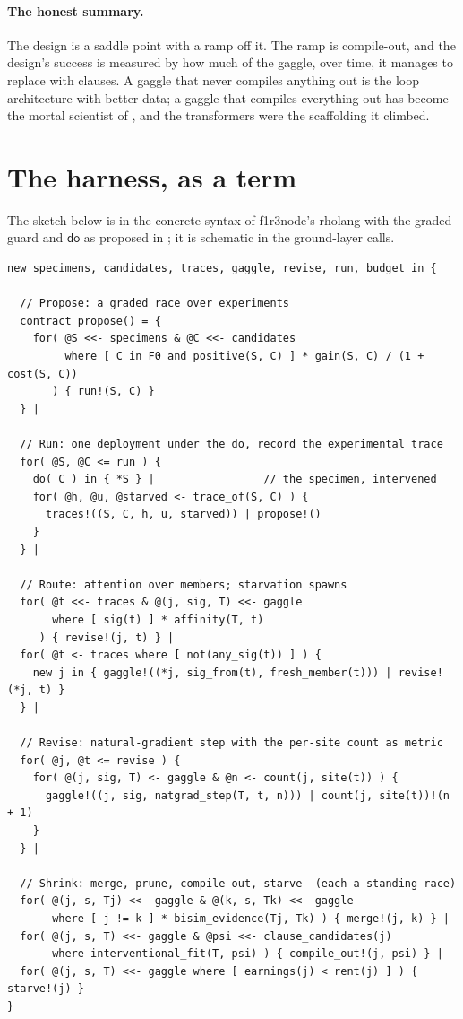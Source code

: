 \documentclass[11pt]{article}
\theoremstyle{plain}
\theoremstyle{definition}
\theoremstyle{remark}
\newcommand{\dok}{\textsf{do}}
\begin{document}
\paragraph{The honest summary.} The design is a saddle point with a ramp off
it. The ramp is compile-out, and the design's success is measured by how much
of the gaggle, over time, it manages to replace with clauses. A gaggle that
never compiles anything out is the loop architecture with better data; a
gaggle that compiles everything out has become the mortal scientist of
\cite{Scientist}, and the transformers were the scaffolding it climbed.

\section{The harness, as a term}\label{sec:term}

The sketch below is in the concrete syntax of f1r3node's rholang with the
graded guard and $\dok$ as proposed in \cite{TransformerProposal,Interventions};
it is schematic in the ground-layer calls.

\begin{lstlisting}
new specimens, candidates, traces, gaggle, revise, run, budget in {

  // Propose: a graded race over experiments
  contract propose() = {
    for( @S <<- specimens & @C <<- candidates
         where [ C in F0 and positive(S, C) ] * gain(S, C) / (1 + cost(S, C))
       ) { run!(S, C) }
  } |

  // Run: one deployment under the do, record the experimental trace
  for( @S, @C <= run ) {
    do( C ) in { *S } |                 // the specimen, intervened
    for( @h, @u, @starved <- trace_of(S, C) ) {
      traces!((S, C, h, u, starved)) | propose!()
    }
  } |

  // Route: attention over members; starvation spawns
  for( @t <<- traces & @(j, sig, T) <<- gaggle
       where [ sig(t) ] * affinity(T, t)
     ) { revise!(j, t) } |
  for( @t <- traces where [ not(any_sig(t)) ] ) {
    new j in { gaggle!((*j, sig_from(t), fresh_member(t))) | revise!(*j, t) }
  } |

  // Revise: natural-gradient step with the per-site count as metric
  for( @j, @t <= revise ) {
    for( @(j, sig, T) <- gaggle & @n <- count(j, site(t)) ) {
      gaggle!((j, sig, natgrad_step(T, t, n))) | count(j, site(t))!(n + 1)
    }
  } |

  // Shrink: merge, prune, compile out, starve  (each a standing race)
  for( @(j, s, Tj) <<- gaggle & @(k, s, Tk) <<- gaggle
       where [ j != k ] * bisim_evidence(Tj, Tk) ) { merge!(j, k) } |
  for( @(j, s, T) <<- gaggle & @psi <<- clause_candidates(j)
       where interventional_fit(T, psi) ) { compile_out!(j, psi) } |
  for( @(j, s, T) <<- gaggle where [ earnings(j) < rent(j) ] ) { starve!(j) }
}
\end{lstlisting}
\end{document}
